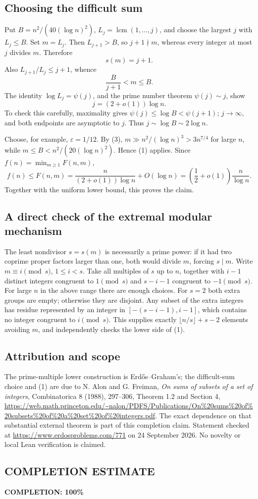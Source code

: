 \subsection*{Choosing the difficult sum}
Put \(B=n^2/(40(\log n)^2)\), \(L_j=\operatorname{lcm}(1,\ldots,j)\), and choose the largest \(j\) with \(L_j\leq B\). Set \(m=L_j\). Then \(L_{j+1}>B\), so \(j+1\nmid m\), whereas every integer at most \(j\) divides \(m\). Therefore
\[
s(m)=j+1. \tag{2}
\]
Also \(L_{j+1}/L_j\leq j+1\), whence
\[
\frac B{j+1}<m\leq B. \tag{3}
\]
The identity \(\log L_j=\psi(j)\), and the prime number theorem \(\psi(j)\sim j\), show
\[
j=(2+o(1))\log n.
\]
To check this carefully, maximality gives
\(\psi(j)\leq\log B<\psi(j+1)\); \(j\to\infty\), and both endpoints are asymptotic to \(j\). Thus \(j\sim\log B\sim2\log n\).

Choose, for example, \(\varepsilon=1/12\). By (3),
\(m\gg n^2/(\log n)^3>3n^{7/4}\) for large \(n\), while \(m\leq B<n^2/(20(\log n)^2)\). Hence (1) applies. Since \(f(n)=\min_{m\geq1}F(n,m)\),
\[
f(n)\leq F(n,m)
=\frac n{(2+o(1))\log n}+O(\log n)
=\left(\frac12+o(1)\right)\frac n{\log n}.
\]
Together with the uniform lower bound, this proves the claim.

\subsection*{A direct check of the extremal modular mechanism}
The least nondivisor \(s=s(m)\) is necessarily a prime power: if it had two coprime proper factors larger than one, both would divide \(m\), forcing \(s\mid m\). Write \(m\equiv i\pmod s\), \(1\leq i<s\). Take all multiples of \(s\) up to \(n\), together with \(i-1\) distinct integers congruent to \(1\pmod s\) and \(s-i-1\) congruent to \(-1\pmod s\). For large \(n\) in the above range there are enough choices. For \(s=2\) both extra groups are empty; otherwise they are disjoint. Any subset of the extra integers has residue represented by an integer in
\([-(s-i-1),i-1]\), which contains no integer congruent to \(i\pmod s\). This supplies exactly \(\lfloor n/s\rfloor+s-2\) elements avoiding \(m\), and independently checks the lower side of (1).

\subsection*{Attribution and scope}
The prime-multiple lower construction is Erd\H{o}s--Graham's; the difficult-sum choice and (1) are due to N. Alon and G. Freiman, \emph{On sums of subsets of a set of integers}, Combinatorica 8 (1988), 297--306, Theorem 1.2 and Section 4, \url{https://web.math.princeton.edu/~nalon/PDFS/Publications/On%20sums%20of%20subsets%20of%20a%20set%20of%20integers.pdf}. The exact dependence on that substantial external theorem is part of this completion claim. Statement checked at \url{https://www.erdosproblems.com/771} on 24 September 2026. No novelty or local Lean verification is claimed.
\subsection*{COMPLETION ESTIMATE}
\textbf{COMPLETION: 100\%}
